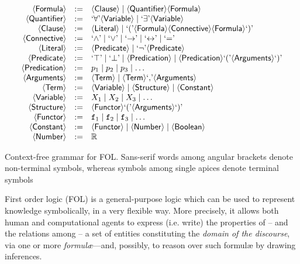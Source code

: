 \documentclass[12pt,a4paper,openright,twoside]{book}
\begin{document}
\begin{table}
    $$\begin{array}{rcl}
        \meta{Formula} & := & \meta{Clause} \mid \meta{Quantifier} \meta{Formula}
        \\
        \meta{Quantifier} & := & \terminal{\forall} \meta{Variable} \mid \terminal{\exists} \meta{Variable}
        \\
        \meta{Clause} & := & \meta{Literal} \mid \terminal{(} \meta{Formula} \meta{Connective} \meta{Formula} \terminal{)}
        \\
        \meta{Connective} & := & \terminal{\wedge} \mid \terminal{\vee} \mid \terminal{\rightarrow} \mid \terminal{\leftrightarrow} \mid \terminal{=}
        \\
        \meta{Literal}  & := & \meta{Predicate} \mid \terminal{\lnot} \meta{Predicate}
        \\
        \meta{Predicate} & := & \terminal{\top} \mid \terminal{\bot} \mid \meta{Predication} \mid \meta{Predication} \terminal{(} \meta{Arguments} \terminal{)}
        \\
        \meta{Predication} & := & p_1 \mid p_2 \mid p_3 \mid \ldots
        \\
        \meta{Arguments} & := & \meta{Term} \mid \meta{Term} \terminal{,} \meta{Arguments}
        \\
        \meta{Term} & := & \meta{Variable} \mid \meta{Structure} \mid \meta{Constant}
        \\
        \meta{Variable} & := & X_1 \mid X_2 \mid X_3 \mid \ldots
        \\
        \meta{Structure} & := & \meta{Functor} \terminal{(} \meta{Arguments} \terminal{)}
        \\
        \meta{Functor} & := & \functor{f}_1 \mid \functor{f}_2 \mid \functor{f}_3 \mid \ldots
        \\
        \meta{Constant} & := & \meta{Functor} \mid \meta{Number}\mid \meta{Boolean}
        \\
        \meta{Number} & := & \mathbb{R}
    \end{array}$$
    \caption[Context-free grammar for FOL]{Context-free grammar for FOL. Sans-serif words among angular brackets denote non-terminal symbols, whereas symbols among single apices denote terminal symbols}
    \label{tab:fol-grammar}
\end{table}

First order logic (FOL) \cite{Smullyan1968} is a general-purpose logic which can be used to represent knowledge symbolically, in a very flexible way.
%
More precisely, it allows both human and computational agents to express (i.e. write) the properties of -- and the relations among -- a set of entities constituting the \emph{domain of the discourse}, via one or more \emph{formul\ae}---and, possibly, to reason over such formul\ae{} by drawing inferences.
\end{document}
